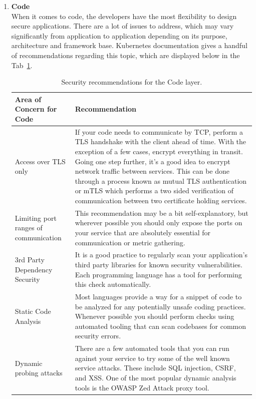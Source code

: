\begin{enumerate}
\item \textbf{Code} \\
When it comes to code, the developers have the most flexibility to design secure applications. There are a lot of issues to address, which may vary significantly from application to application depending on its purpose, architecture and framework base. Kubernetes documentation gives a handful of recommendations regarding this topic, which are displayed below in the Tab~\ref{tab:code-security-recommendations}.

\begin{table}[H]
    \begin{center}
        \begin{tabular}{ | p{} | p{} | } 
        \hline
        \textbf{Area of Concern for Code} & \textbf{Recommendation} \\ 
        \hline
        Access over TLS only & If your code needs to communicate by TCP, perform a TLS handshake with the client ahead of time. With the exception of a few cases, encrypt everything in transit. Going one step further, it's a good idea to encrypt network traffic between services. This can be done through a process known as mutual TLS authentication or mTLS which performs a two sided verification of communication between two certificate holding services. \\ 
        \hline
        Limiting port ranges of communication & This recommendation may be a bit self-explanatory, but wherever possible you should only expose the ports on your service that are absolutely essential for communication or metric gathering. \\ 
        \hline
        3rd Party Dependency Security & It is a good practice to regularly scan your application's third party libraries for known security vulnerabilities. Each programming language has a tool for performing this check automatically. \\
        \hline
        Static Code Analysis & Most languages provide a way for a snippet of code to be analyzed for any potentially unsafe coding practices. Whenever possible you should perform checks using automated tooling that can scan codebases for common security errors. \\
        \hline
        Dynamic probing attacks & There are a few automated tools that you can run against your service to try some of the well known service attacks. These include SQL injection, CSRF, and XSS. One of the most popular dynamic analysis tools is the OWASP Zed Attack proxy tool. \\
        \hline
        \end{tabular}
    \end{center}
    \caption{Security recommendations for the Code layer.}
    \label{tab:code-security-recommendations}
\end{table}
                      
\end{enumerate}

